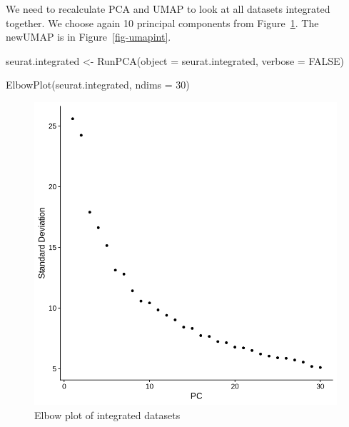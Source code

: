 \documentclass[
  letterpaper,
  DIV=11,
  numbers=noendperiod]{scrartcl}
\newenvironment{Shaded}{\begin{snugshade}}{\end{snugshade}}
\newcommand{\AttributeTok}[1]{\textcolor[rgb]{0.49,0.56,0.16}{#1}}
\newcommand{\ConstantTok}[1]{\textcolor[rgb]{0.53,0.00,0.00}{#1}}
\newcommand{\DecValTok}[1]{\textcolor[rgb]{0.25,0.63,0.44}{#1}}
\newcommand{\FunctionTok}[1]{\textcolor[rgb]{0.02,0.16,0.49}{#1}}
\newcommand{\NormalTok}[1]{\textcolor[rgb]{0.00,0.44,0.13}{#1}}
\newcommand{\OtherTok}[1]{\textcolor[rgb]{0.00,0.44,0.13}{#1}}
\begin{document}
We need to recalculate PCA and UMAP to look at all datasets integrated
together. We choose again 10 principal components from
Figure~\ref{fig-elbowint}. The newUMAP is in Figure~\ref{fig-umapint}.

\begin{Shaded}
\begin{Highlighting}[]
\NormalTok{seurat.integrated }\OtherTok{\textless{}{-}} \FunctionTok{RunPCA}\NormalTok{(}\AttributeTok{object =}\NormalTok{ seurat.integrated, }\AttributeTok{verbose =} \ConstantTok{FALSE}\NormalTok{)}
\end{Highlighting}
\end{Shaded}

\begin{Shaded}
\begin{Highlighting}[]
\FunctionTok{ElbowPlot}\NormalTok{(seurat.integrated, }\AttributeTok{ndims =} \DecValTok{30}\NormalTok{)}
\end{Highlighting}
\end{Shaded}

\begin{figure}[H]

{\centering \includegraphics{notebook_files/figure-pdf/fig-elbowint-output-1.png}

}

\caption{\label{fig-elbowint}Elbow plot of integrated datasets}

\end{figure}
\end{document}
